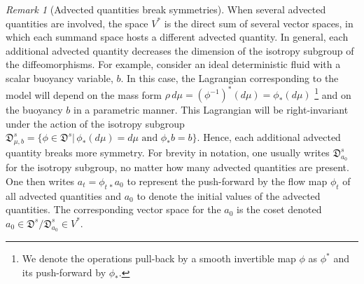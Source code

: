\documentclass[11pt, oneside]{article}   	%
\numberwithin{equation}{section}
\theoremstyle{plain}
\theoremstyle{definition}
\theoremstyle{remark}
\newtheorem{remark}[theorem]{Remark}
\newcommand{\<}{\langle}
\renewcommand{\>}{\rangle}
\begin{document}
\begin{remark}[Advected quantities break symmetries] 
When several advected quantities are involved, the space $V^*$ is the direct sum of several vector spaces, in which each summand space hosts a different advected quantity. In general, each additional advected quantity decreases the dimension of the isotropy subgroup of the diffeomorphisms. For example, consider an ideal deterministic fluid with a scalar buoyancy variable, $b$. In this case, the Lagrangian corresponding to the model will depend on the mass form $\rho\,d\mu = (\phi^{-1})^*(d\mu)=\phi_*(d\mu)$%
\footnote{We denote the operations pull-back by a smooth invertible map $\phi$ as $\phi^*$ and its push-forward by $\phi_*$.}
 and on the buoyancy $b$ in a parametric manner. This Lagrangian will be right-invariant under the action of the isotropy subgroup $\mathfrak{D}^s_{\mu,b} = \{\phi\in\mathfrak{D}^s|\, \phi_*(d\mu)=d\mu \text{ and } \phi_*b=b\}$. Hence, each additional advected quantity breaks more symmetry. For brevity in notation, one usually writes $\mathfrak{D}^s_{a_0}$ for the isotropy subgroup, no matter how many advected quantities are present. One then writes $a_t=\phi_{t\,*}a_0$ to represent the push-forward by the flow map $\phi_t$ of all advected quantities and $a_0$ to denote the initial values of the advected quantities. The corresponding vector space for the $a_0$ is the coset denoted $a_0\in \mathfrak{D}^s/\mathfrak{D}^s_{a_0}\in V^*$.
\end{remark}
\end{document}
